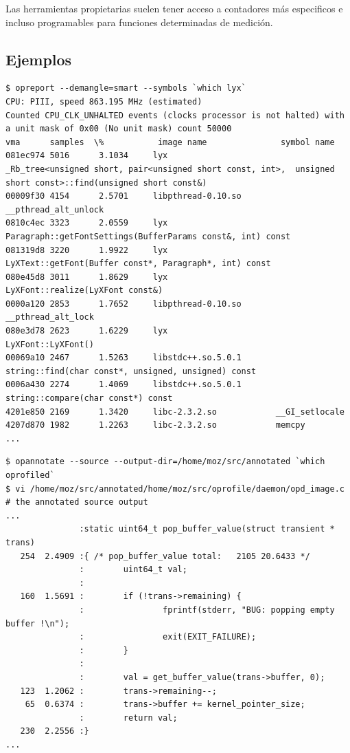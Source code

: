 \documentclass[a4paper]{report}
\begin{document}
Las herramientas propietarias suelen tener acceso a contadores m\'as especificos e
incluso programables para funciones determinadas de medici\'on.

\subsection{Ejemplos}

{\small
\begin{verbatim}
$ opreport --demangle=smart --symbols `which lyx`
CPU: PIII, speed 863.195 MHz (estimated)
Counted CPU_CLK_UNHALTED events (clocks processor is not halted) with a unit mask of 0x00 (No unit mask) count 50000
vma      samples  \%           image name               symbol name
081ec974 5016      3.1034     lyx                      _Rb_tree<unsigned short, pair<unsigned short const, int>,  unsigned short const>::find(unsigned short const&)
00009f30 4154      2.5701     libpthread-0.10.so       __pthread_alt_unlock
0810c4ec 3323      2.0559     lyx                      Paragraph::getFontSettings(BufferParams const&, int) const
081319d8 3220      1.9922     lyx                      LyXText::getFont(Buffer const*, Paragraph*, int) const
080e45d8 3011      1.8629     lyx                      LyXFont::realize(LyXFont const&)
0000a120 2853      1.7652     libpthread-0.10.so       __pthread_alt_lock
080e3d78 2623      1.6229     lyx                      LyXFont::LyXFont()
00069a10 2467      1.5263     libstdc++.so.5.0.1       string::find(char const*, unsigned, unsigned) const
0006a430 2274      1.4069     libstdc++.so.5.0.1       string::compare(char const*) const
4201e850 2169      1.3420     libc-2.3.2.so            __GI_setlocale
4207d870 1982      1.2263     libc-2.3.2.so            memcpy
...
\end{verbatim}

\begin{verbatim}
$ opannotate --source --output-dir=/home/moz/src/annotated `which oprofiled`
$ vi /home/moz/src/annotated/home/moz/src/oprofile/daemon/opd_image.c # the annotated source output
...
               :static uint64_t pop_buffer_value(struct transient * trans)
   254  2.4909 :{ /* pop_buffer_value total:   2105 20.6433 */
               :        uint64_t val;
               :
   160  1.5691 :        if (!trans->remaining) {
               :                fprintf(stderr, "BUG: popping empty buffer !\n");
               :                exit(EXIT_FAILURE);
               :        }
               :
               :        val = get_buffer_value(trans->buffer, 0);
   123  1.2062 :        trans->remaining--;
    65  0.6374 :        trans->buffer += kernel_pointer_size;
               :        return val;
   230  2.2556 :}
...
\end{verbatim}
}
\end{document}
